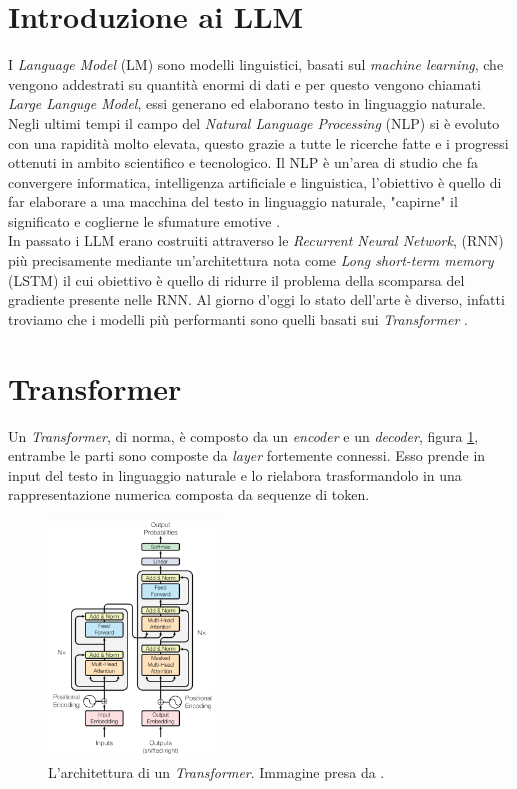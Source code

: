 \section{Introduzione ai LLM}
I \emph{Language Model} (LM) sono modelli linguistici, basati sul \emph{machine learning}, che vengono addestrati su quantit\`a enormi di dati e per questo vengono chiamati \emph{Large Languge Model}, essi generano ed elaborano testo in linguaggio naturale. \\
Negli ultimi tempi il campo del \emph{Natural Language Processing} (NLP) si \`e evoluto con una rapidit\`a molto elevata, questo grazie a tutte le ricerche fatte e i progressi ottenuti in ambito scientifico e tecnologico. 
Il NLP \`e un'area di studio che fa convergere informatica, intelligenza artificiale e linguistica, l'obiettivo \`e quello di far elaborare a una macchina del testo in linguaggio naturale, "capirne" il significato e coglierne le sfumature emotive \cite{blaise2022llmunderstandus}.\\
In passato i LLM erano costruiti attraverso le \emph{Recurrent Neural Network}, (RNN) pi\`u precisamente mediante un'architettura nota come \emph{Long short-term memory} (LSTM) il cui obiettivo \`e quello di ridurre il problema della scomparsa del gradiente presente nelle RNN.
Al giorno d'oggi lo stato dell'arte \`e diverso, infatti troviamo che i modelli pi\`u performanti sono quelli basati sui \emph{Transformer} \cite{vaswani2023attentionneed}.

\section{Transformer}
Un \emph{Transformer}, di norma, \`e composto da un \emph{encoder} e un \emph{decoder}, figura \ref{fig:architetturaTransformer}, entrambe le parti sono composte da \emph{layer} fortemente connessi.
Esso prende in input del testo in linguaggio naturale e lo rielabora trasformandolo in una rappresentazione numerica composta da sequenze di token.
\begin{figure}[H]
    \centering
    \includegraphics[width=0.4\textwidth]{media/1-introduzioneLLM/thetransformerarchitecture.png}
    \caption{L'architettura di un \emph{Transformer}. Immagine presa da \cite{vaswani2023attentionneed}.}
    \label{fig:architetturaTransformer}
\end{figure}

